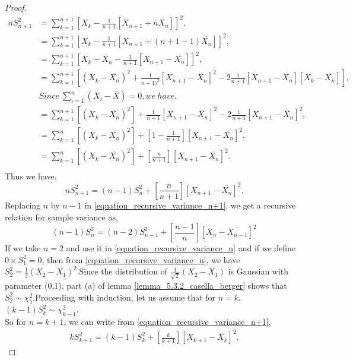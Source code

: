 \documentclass[a4paper,english,12pt]{article}
\begin{document}
\begin{proof}
\begin{align}
nS_{n+1} ^2& =\sum\limits_{k=1}^{n+1} [X_{k}-\frac{1}{n+1} [X_{n+1} + n\overline{X_n}]]^2 , \nonumber \\
& =\sum\limits_{k=1}^{n+1} [X_{k}-\frac{1}{n+1} [X_{n+1} + (n+1-1)\overline{X_n}]]^2 , \nonumber \\
& =\sum\limits_{k=1}^{n+1} [X_{k}-\overline{X_n}-\frac{1}{n+1}[X_{n+1} - \overline{X_n}]]^2 , \nonumber \\
& =\sum\limits_{k=1}^{n+1} [(X_{k}-\overline{X_n})^2+\frac{1}{n+1)^2}[X_{n+1} - \overline{X_n}]^2-2 \frac{1}{n+1}[X_{n+1} - \overline{X_n}][X_{k}-\overline{X_n}]] , \nonumber \\
& Since~\sum_{i=1}^n(X_i-\overline{X})=0,we~have, \nonumber \\
& =\sum\limits_{k=1}^{n+1} [(X_{k}-\overline{X_n})^2]+\frac{1}{n+1}[X_{n+1} - \overline{X_n}]^2-2 \frac{1}{n+1}[X_{n+1} - \overline{X_n}]^2 , \nonumber \\
& =\sum\limits_{k=1}^{n} [(X_{k}-\overline{X_n})^2]+[1-\frac{1}{n+1}][X_{n+1} - \overline{X_n}]^2 , \nonumber \\
& =\sum\limits_{k=1}^{n} [(X_{k}-\overline{X_n})^2]+[\frac{n}{n+1}][X_{n+1} - \overline{X_n}]^2 . \nonumber \\
\end{align}
Thus we have,
\begin{equation} \label{equation_recursive_variance_n+1}
nS_{n+1} ^2=(n-1)S_{n} ^2+[\frac{n}{n+1}][X_{n+1} - \overline{X_n}]^2.
\end{equation}
Replacing $n$ by $n-1$ in \eqref{equation_recursive_variance_n+1}, we get a recursive relation for sample variance as,
\begin{equation} \label{equation_recursive_variance_n}
(n-1)S_{n} ^2=(n-2)S_{n-1} ^2+[\frac{n-1}{n}][X_{n} - \overline{X_{n-1}}]^2
\end{equation} 
If we take $n=2$ and use it in \eqref{equation_recursive_variance_n} and if we define $0\times S_1 ^2=0$, then from \eqref{equation_recursive_variance_n}, we have $S_2^2=\frac{1}{2}(X_2-X_1)^2$.Since the distribution of $\frac{1}{\sqrt{2}}(X_2-X_1)$ is Gaussian with parameter (0,1), part (a) of lemma  \ref{lemma_5.3.2_casella_berger} shows that $S_2 ^2 \sim \chi_1 ^2$.Proceeding with induction, let us assume that for $n=k$, $(k-1)S_k ^2 \sim \chi_{k-1} ^2$.\\
So for $n=k+1$, we can write from \eqref{equation_recursive_variance_n+1},
\begin{align}
kS_{k+1} ^2=(k-1)S_{k} ^2+[\frac{k}{k+1}][X_{k+1} - \overline{X_k}]^2.

\end{align}
\end{proof}
\end{document}

